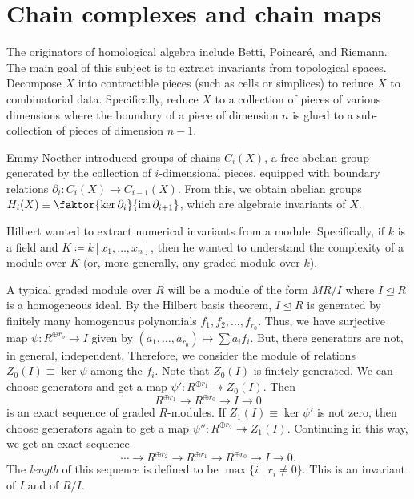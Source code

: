 \documentclass[10pt,letterpaper,cm]{nupset}
\theoremstyle{definition}
\theoremstyle{theorem}
\theoremstyle{remark}
\newcommand{\1}{\mathbf{1}}
\newcommand{\0}{\vec 0}
\DeclareMathOperator{\im}{im}
\begin{document}
\section{Chain complexes and chain maps}

The originators of homological algebra include Betti, Poincar\'e, and Riemann. The main goal of this subject is to extract invariants from topological spaces. Decompose $X$ into contractible pieces (such as cells or simplices) to reduce $X$ to combinatorial data. Specifically, reduce $X$ to a collection of pieces of various dimensions where the boundary of a piece of dimension $n$ is glued to a sub-collection of pieces of dimension $n-1$. 

Emmy Noether introduced groups of chains $C_i(X)$, a free abelian group generated by the collection of $i$-dimensional pieces, equipped with boundary relations $\partial_i : C_i(X) \to C_{i-1}(X)$. From this, we obtain abelian groups $H_i(X)\equiv \faktor{\ker{\partial_i}}{\im{\partial_{i+1}}}$, which are algebraic invariants of $X$. 

Hilbert wanted to extract numerical invariants from a module. Specifically, if $k$ is a field and $K\coloneqq  k[x_1, \ldots, x_n]$, then he wanted to understand the complexity of a module over $K$ (or, more generally, any graded module  over $k$).

\bigskip

A typical graded module over $R$ will be a module of the form $M R/I$ where $I \unlhd R$ is a homogeneous ideal. By the Hilbert basis theorem, $I \unlhd R$ is generated by finitely many homogenous polynomials $f_1, f_2, \ldots, f_{r_0}$. Thus, we have surjective map $\psi: R^{\oplus r_o} \to I $ given by $\left(a_1, \ldots, a_{r_0}\right) \mapsto \sum a_if_i$. But, there generators are not, in general, independent. Therefore, we consider the module of relations $Z_0(I) \equiv \ker{\psi}$ among the $f_i$. Note that $Z_0(I)$ is finitely generated. We can choose generators and get a map $\psi': R^{\oplus r_1} \twoheadrightarrow Z_0(I)$. Then $$R^{\oplus r_1} \to R^{\oplus r_0} \to I \to 0$$ is an exact sequence of graded $R$-modules. If $Z_1(I) \equiv \ker{\psi'}$ is not zero, then choose generators again to get a map $\psi'': R^{\oplus r_2} \twoheadrightarrow Z_1(I)$. Continuing in this way, we get an exact sequence $$\cdots \to R^{\oplus r_2} \to R^{\oplus r_1} \to R^{\oplus r_0} \to I \to 0.$$ The \textit{length} of this sequence is defined to be $\max\{i \mid r_i \ne 0\}$. This is an invariant of $I$ and of $R/I$.
\end{document}
